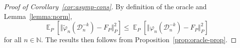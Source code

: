 \documentclass[a4paper,danish]{article}
\theoremstyle{plain} %
\numberwithin{theorem}{section}
\theoremstyle{definition} %
\theoremstyle{remark}
\DeclareMathOperator{\E}{\mathbb{E}} %
\newcommand{\N}{\mathbb{N}}
\renewcommand{\phi}{\varphi}
\newcommand{\1}{\mathds{1}}
\newcommand{\data}{\ensuremath{\mathcal{D}}}
\begin{document}
\begin{proof}[Proof of Corollary~\ref{cor:asymp-cons}]
  By definition of the oracle and Lemma~\ref{lemma:norm},
  \begin{equation*}
    \E_{P}{\left[ \Vert \tilde{\phi}_n(\data_n^{-k}) - F_P \Vert_{P}^2
      \right]} \leq \E_{P}{\left[ \Vert \phi_n(\data_n^{-k}) - F_P \Vert_{P}^2
      \right]}  
  \end{equation*}
  for all \( n \in \N \). The results then follows from
  Proposition~\ref{prop:oracle-prop}.
\end{proof}
\end{document}
